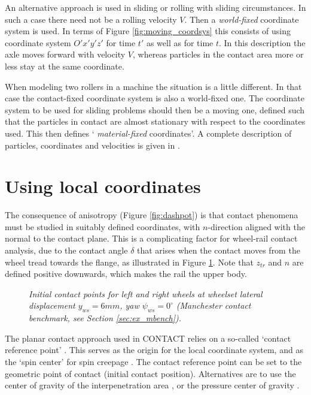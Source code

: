 \documentclass[12pt]{report}
\begin{document}
An alternative approach is used in sliding or rolling with sliding
circumstances. In such a case there need not be a rolling velocity $V$.
Then a {\em world-fixed\/} coordinate system is used. In terms of Figure
\ref{fig:moving_coordsys} this consists of using coordinate system $O'x'y'z'$
for time $t'$ as well as for time $t$. In this description the axle moves
forward with velocity $V$, whereas particles in the contact area more or
less stay at the same coordinate.

When modeling two rollers in a machine the situation is a little different.
In that case the contact-fixed coordinate system is also a world-fixed one.
The coordinate system to be used for sliding problems should then be a
moving one, defined such that the particles in contact are almost
stationary with respect to the coordinates used. This then defines `{\em
material-fixed\/} coordinates'.  A complete description of particles,
coordinates and velocities is given in \cite{Kalker1990}.

\section{Using local coordinates}

The consequence of anisotropy (Figure \ref{fig:dashpot}) is that contact
phenomena must be studied in suitably defined coordinates, with
$n$-direction aligned with the normal to the contact plane. This is a
complicating factor for wheel-rail contact analysis, due to the contact
angle $\delta$ that arises when the contact moves from the wheel tread
towards the flange, as illustrated in Figure \ref{fig:s1002_init_cp_6mm}.
Note that $z_{tr}$ and $n$ are defined positive downwards, which makes the
rail the upper body.

\begin{figure}[bt]
\centering
{}
\caption{\em Initial contact points for left and right wheels at wheelset
lateral displacement $y_{ws}=6\unit{mm}$, yaw $\psi_{ws}=0^\circ$ (Manchester
contact benchmark, see Section \ref{sec:ex_mbench}).}
\label{fig:s1002_init_cp_6mm}
\end{figure}

The planar contact approach used in CONTACT relies on a so-called `contact
reference point' \cite{Vollebregt2020b-wrgeom}. This serves as the origin
for the local coordinate system, and as the `spin center' for spin creepage
\cite{Vollebregt2018a-sdec}. The contact reference point can be set to the
geometric point of contact (initial contact position). Alternatives are to
use the center of gravity of the interpenetration area
\cite{Vollebregt2011b-iavsd2011}, or the pressure center of gravity
\cite{Vollebregt2018a-sdec}.
\end{document}
